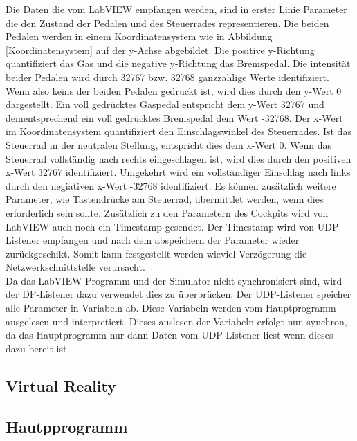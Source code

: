 Die Daten die vom LabVIEW empfangen werden, sind in erster Linie Parameter die den Zustand der Pedalen und des Steuerrades representieren. Die beiden Pedalen werden in einem Koordinatensystem wie in Abbildung \ref{Koordinatensystem} auf der y-Achse abgebildet. Die positive y-Richtung quantifiziert das Gas und die negative y-Richtung das Bremspedal. Die intensität beider Pedalen wird durch 32767 bzw. 32768 ganzzahlige Werte identifiziert. Wenn also keins der beiden Pedalen gedrückt ist, wird dies durch den y-Wert 0 dargestellt. Ein voll gedrücktes Gaspedal entspricht dem y-Wert 32767 und dementsprechend ein voll gedrücktes Bremspedal dem Wert -32768. Der x-Wert im Koordinatensystem quantifiziert den Einschlagswinkel des Steuerrades. Ist das Steuerrad in der neutralen Stellung, entspricht dies dem x-Wert 0. Wenn das Steuerrad vollständig nach rechts eingeschlagen ist, wird dies durch den positiven x-Wert 32767 identifiziert. Umgekehrt wird ein vollständiger Einschlag nach links durch den negiativen x-Wert -32768 identifiziert. Es können zusätzlich weitere Parameter, wie Tastendrücke am Steuerrad, übermittlet werden, wenn dies erforderlich sein sollte. Zusätzlich zu den Parametern des Cockpits wird von LabVIEW auch noch ein Timestamp gesendet. Der Timestamp wird von UDP-Listener empfangen und nach dem abspeichern der Parameter wieder zurückgeschikt. Somit kann festgestellt werden wieviel Verzögerung die Netzwerkschnittstelle verursacht. \\
Da das LabVIEW-Programm und der Simulator nicht synchronisiert sind, wird der DP-Listener dazu verwendet dies zu überbrücken. Der UDP-Listener speicher alle Parameter in Variabeln ab. Diese Variabeln werden vom Hauptprogramm ausgelesen und interpretiert. Dieses auslesen der Variabeln erfolgt nun synchron, da das Hauptprogramm nur dann Daten vom UDP-Listener liest wenn dieses dazu bereit ist.

\subsection{Virtual Reality}
\subsection{Hautpprogramm}




